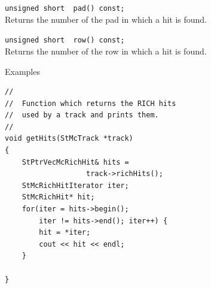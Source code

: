\begin{Entry}
    \verb+unsigned short  pad() const;+\\
    Returns the number of the pad in which a hit is found. 

    \verb+unsigned short  row() const;+\\
    Returns the number of the row in which a hit is found. 

\item[Examples]
{\footnotesize
\begin{verbatim}
//
//  Function which returns the RICH hits
//  used by a track and prints them.
//
void getHits(StMcTrack *track)
{
    StPtrVecMcRichHit& hits =
                   track->richHits();
    StMcRichHitIterator iter;
    StMcRichHit* hit;
    for(iter = hits->begin();
        iter != hits->end(); iter++) {
        hit = *iter;
        cout << hit << endl;
    }
    
}
\end{verbatim}
}%
\end{Entry}
\clearpage
%
%
